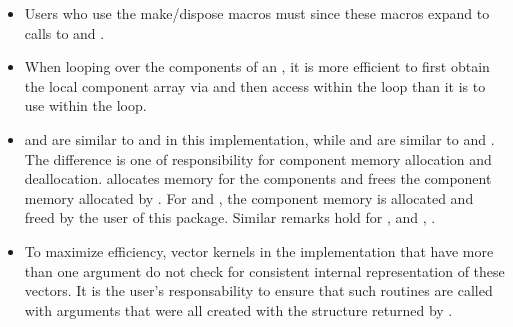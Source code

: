            
\begin{itemize}
                                        
\item
  Users who use the make/dispose macros must                 
   since these macros expand to calls to     
   and .                                             
       
\item
  When looping over the components of an  , it is     
  more efficient to first obtain the local component array via       
   and then access  within the     
  loop than it is to use  within the loop.        
                                                               
\item
   and  are similar to  and  
   in this {\nvector} implementation, while  and 
    are      
  similar to   and . The        
  difference is one of responsibility for component memory     
  allocation and deallocation.  allocates memory  
  for the  components and  frees the     
  component memory allocated by . For    
  and , the component memory is allocated and      
  freed by the user of this package. Similar remarks hold for  
  ,   and ,              
  .                                            

\item
  To maximize efficiency, vector kernels in the {\nvecp} implementation
  that have more than one  argument do not check for
  consistent internal representation of these vectors. It is the user's 
  responsability to ensure that such routines are called with 
  arguments that were all created with the  structure returned
  by .

\end{itemize}

